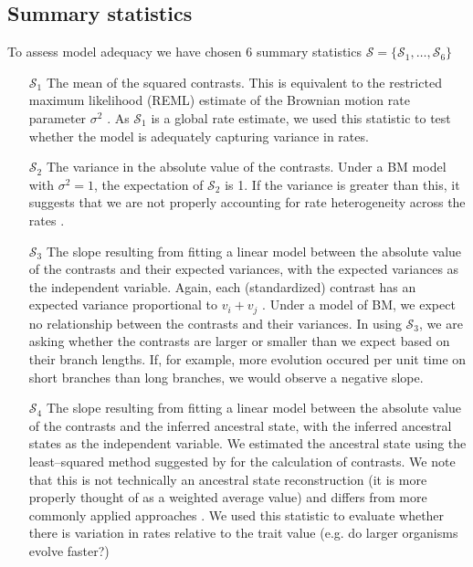 \documentclass[a4paper,12pt]{article}
\begin{document}
\subsection*{Summary statistics}

To assess model adequacy we have chosen 6 summary statistics $\mathcal{S} = \lbrace \mathcal{S}_1, \ldots, \mathcal{S}_6 \rbrace$

\begin{enumerate}
\item[$\mathcal{S}_1$] The mean of the squared contrasts. This is equivalent to the restricted maximum likelihood (REML) estimate of the Brownian motion rate parameter $\sigma^2$ \citep{Garland1992, Rohlf2001}. As $\mathcal{S}_1$ is a global rate estimate, we used this statistic to test whether the model is adequately capturing variance in rates.

\item[$\mathcal{S}_2$] The variance in the absolute value of the contrasts. Under a BM model with $\sigma^2 = 1$, the expectation of $\mathcal{S}_2$ is 1. If the variance is greater than this, it suggests that we are not properly accounting for rate heterogeneity across the rates \citep[\textit{sensu}][]{Omeara2006, Eastman2011}.

\item[$\mathcal{S}_3$] The slope resulting from fitting a linear model between the absolute value of the contrasts and their expected variances, with the expected variances as the independent variable. Again, each (standardized) contrast has an expected variance proportional to $v_i + v_j$  \citep{Felsenstein1985}. Under a model of BM, we expect no relationship between the contrasts and their variances. In using $\mathcal{S}_3$, we are asking whether the contrasts are larger or smaller than we expect based on their branch lengths. If, for example, more evolution occured per unit time on short branches than long branches, we would observe a negative slope.

\item[$\mathcal{S}_4$] The slope resulting from fitting a linear model between the absolute value of the contrasts and the inferred ancestral state, with the inferred ancestral states as the independent variable. We estimated the ancestral state using the least--squared method suggested by \citep{Felsenstein1985} for the calculation of contrasts. We note that this is not technically an ancestral state reconstruction (it is more properly thought of as a weighted average value) and differs from more commonly applied approaches \citep[such as the  maximum likelihood estimator][]{Schluter1997}. We used this statistic to evaluate whether there is variation in rates relative to the trait value (e.g. do larger organisms evolve faster?)


\end{enumerate}
\end{document}
